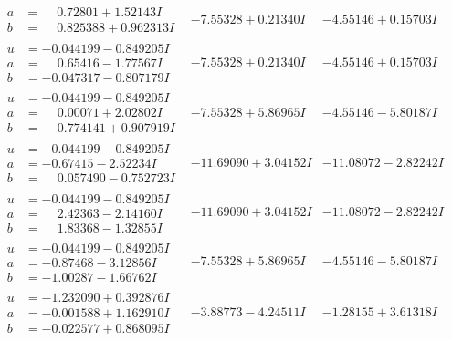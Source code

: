 \documentclass[1p]{elsarticle_modified}
\theoremstyle{definition}
\begin{document}
$$\begin{array}{c|c|c}
\begin{aligned}
a &= \phantom{-}0.72801 + 1.52143 I \\
b &= \phantom{-}0.825388 + 0.962313 I\end{aligned}
 & -7.55328 + 0.21340 I & -4.55146 + 0.15703 I \\ \hline\begin{aligned}
u &= -0.044199 - 0.849205 I \\
a &= \phantom{-}0.65416 - 1.77567 I \\
b &= -0.047317 - 0.807179 I\end{aligned}
 & -7.55328 + 0.21340 I & -4.55146 + 0.15703 I \\ \hline\begin{aligned}
u &= -0.044199 - 0.849205 I \\
a &= \phantom{-}0.00071 + 2.02802 I \\
b &= \phantom{-}0.774141 + 0.907919 I\end{aligned}
 & -7.55328 + 5.86965 I & -4.55146 - 5.80187 I \\ \hline\begin{aligned}
u &= -0.044199 - 0.849205 I \\
a &= -0.67415 - 2.52234 I \\
b &= \phantom{-}0.057490 - 0.752723 I\end{aligned}
 & -11.69090 + 3.04152 I & -11.08072 - 2.82242 I \\ \hline\begin{aligned}
u &= -0.044199 - 0.849205 I \\
a &= \phantom{-}2.42363 - 2.14160 I \\
b &= \phantom{-}1.83368 - 1.32855 I\end{aligned}
 & -11.69090 + 3.04152 I & -11.08072 - 2.82242 I \\ \hline\begin{aligned}
u &= -0.044199 - 0.849205 I \\
a &= -0.87468 - 3.12856 I \\
b &= -1.00287 - 1.66762 I\end{aligned}
 & -7.55328 + 5.86965 I & -4.55146 - 5.80187 I \\ \hline\begin{aligned}
u &= -1.232090 + 0.392876 I \\
a &= -0.001588 + 1.162910 I \\
b &= -0.022577 + 0.868095 I\end{aligned}
 & -3.88773 - 4.24511 I & -1.28155 + 3.61318 I \\ \hline\begin{aligned}

\end{aligned}
\end{array}$$
\end{document}
